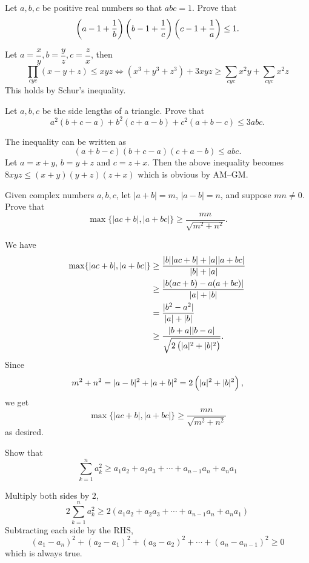 \begin{prbm}
Let $ a, b, c$ be positive real numbers so that $abc=1$. Prove that
\[ \left(a-1+\frac{1}{b}\right) \left(b-1+\frac{1}{c}\right) \left(c-1+\frac{1}{a}\right) \le 1. \]
\end{prbm}

\begin{solution}
Let $a=\dfrac{x}{y}, b=\dfrac{y}{z}, c=\dfrac{z}{x}$, then
\[ \prod_{cyc}(x-y+z)\le xyz \iff (x^3+y^3+z^3)+3xyz \ge \sum_{cyc}x^2y+\sum_{cyc}x^2z \]
This holds by Schur's inequality.
\end{solution}
\pagebreak

\begin{prbm}
Let $a,b,c$ be the side lengths of a triangle. Prove that
\[ a^2(b+c-a)+b^2(c+a-b)+c^2(a+b-c)\le3abc. \]
\end{prbm}

\begin{solution}
The inequality can be written as 
\[ (a+b-c)(b+c-a)(c+a-b)\le abc. \]
Let $a=x+y$, $b=y+z$ and $c=z+x$. Then the above inequality becomes $8xyz\le(x+y)(y+z)(z+x)$ which is obvious by AM--GM.
\end{solution}
\pagebreak

\begin{prbm}
Given complex numbers $a,b,c$, let $|a+b|=m$, $|a-b|=n$, and suppose $mn\neq0$. Prove that
\[ \max\{|ac+b|,|a+bc|\}\ge\frac{mn}{\sqrt{m^2+n^2}}. \]
\end{prbm}

\begin{solution}
We have
\begin{align*}
\max\{|ac+b|,|a+bc|\}
&\ge\frac{|b||ac+b|+|a||a+bc|}{|b|+|a|}\\
&\ge\frac{|b(ac+b)-a(a+bc)|}{|a|+|b|}\\
&=\frac{|b^2-a^2|}{|a|+|b|}\\
&\ge\frac{|b+a||b-a|}{\sqrt{2\left(|a|^2+|b|^2\right)}}.
\end{align*}
Since
\[ m^2+n^2=|a-b|^2+|a+b|^2=2\left(|a|^2+|b|^2\right), \]
we get
\[ \max\{|ac+b|,|a+bc|\}\ge\frac{mn}{\sqrt{m^2+n^2}} \]
as desired.
\end{solution}
\pagebreak

\begin{prbm}
Show that 
\[ \sum_{k=1}^{n}a_k^2 \ge a_1 a_2+a_2a_3+\cdots+a_{n-1}a_n+a_na_1 \]
\end{prbm}

\begin{solution}
Multiply both sides by $2$,
\[ 2\sum_{k=1}^{n}a_{k}^{2}\ge 2(a_{1}a_{2}+a_{2}a_{3}+\cdots+a_{n-1}a_{n}+a_{n}a_{1}) \]
Subtracting each side by the RHS, 
\[ (a_1-a_n)^2+(a_2-a_1)^2+(a_3-a_2)^2+\cdots+(a_n-a_{n-1})^2\ge 0 \]
which is always true.
\end{solution}
\pagebreak

